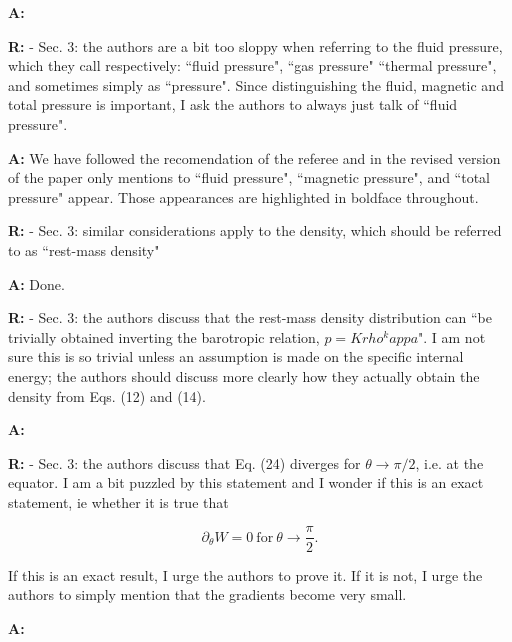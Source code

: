 \documentclass{article}
\begin{document}
\bigskip

{\bf A:} 

\bigskip

{\bf R:} - Sec. 3: the authors are a bit too sloppy when referring to the fluid
pressure, which they call respectively: ``fluid pressure", ``gas
pressure" ``thermal pressure", and sometimes simply as ``pressure". Since
distinguishing the fluid, magnetic and total pressure is important, I
ask the authors to always just talk of ``fluid pressure".

\bigskip

{\bf A:} We have followed the recomendation of the referee and in the revised version
of the paper only mentions to ``fluid pressure", ``magnetic pressure", and 
``total pressure" appear. Those appearances are highlighted in boldface
throughout.

\bigskip

{\bf R:} - Sec. 3: similar considerations apply to the density, which should
be referred to as ``rest-mass density"

\bigskip

{\bf A:} Done.

\bigskip

{\bf R:} - Sec. 3: the authors discuss that the rest-mass density distribution can
``be trivially obtained inverting the barotropic relation, $p = K
rho^kappa$". I am not sure this is so trivial unless an assumption is
made on the specific internal energy; the authors should discuss more
clearly how they actually obtain the density from Eqs. (12) and (14).

\bigskip

{\bf A:} 

\bigskip

{\bf R:} - Sec. 3: the authors discuss that Eq. (24) diverges for $\theta \rightarrow \pi/2$,
i.e. at the equator. I am a bit puzzled by this statement and I wonder if
this is an exact statement, ie whether it is true that

\begin{equation}
\partial_{\theta} W = 0 \ \mathrm{for} \ \theta \rightarrow \frac{\pi}{2}.
\end{equation}

If this is an exact result, I urge the authors to prove it. If it is
not, I urge the authors to simply mention that the gradients become
very small.

\bigskip

{\bf A:} 

\bigskip
\end{document}
